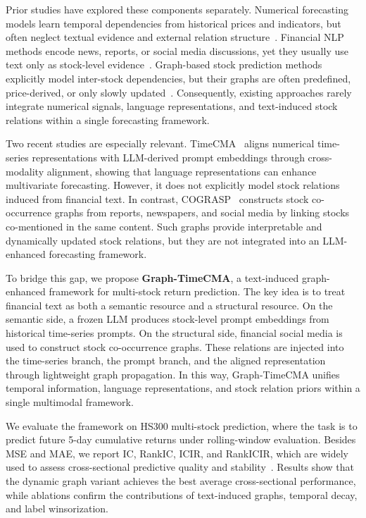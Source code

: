 \documentclass[runningheads]{llncs}
\begin{document}
Prior studies have explored these components separately. Numerical forecasting models learn temporal dependencies from historical prices and indicators, but often neglect textual evidence and external relation structure~\cite{zhou2021informer,wu2021autoformer,nie2022patchtst,liu2023itransformer,wang2024timemixer}. Financial NLP methods encode news, reports, or social media discussions, yet they usually use text only as stock-level evidence~\cite{xu2018stocknet,sawhney2020deep,araci2019finbert,wu2023bloomberggpt,wang2024llmfactor}. Graph-based stock prediction methods explicitly model inter-stock dependencies, but their graphs are often predefined, price-derived, or only slowly updated~\cite{xu2021hist,qian2024mdgnn,xia2024cisthpan}. Consequently, existing approaches rarely integrate numerical signals, language representations, and text-induced stock relations within a single forecasting framework.

Two recent studies are especially relevant. TimeCMA~\cite{liu2025timecma} aligns numerical time-series representations with LLM-derived prompt embeddings through cross-modality alignment, showing that language representations can enhance multivariate forecasting. However, it does not explicitly model stock relations induced from financial text. In contrast, COGRASP~\cite{li2025cograsp} constructs stock co-occurrence graphs from reports, newspapers, and social media by linking stocks co-mentioned in the same content. Such graphs provide interpretable and dynamically updated stock relations, but they are not integrated into an LLM-enhanced forecasting framework.

To bridge this gap, we propose \textbf{Graph-TimeCMA}, a text-induced graph-enhanced framework for multi-stock return prediction. The key idea is to treat financial text as both a semantic resource and a structural resource. On the semantic side, a frozen LLM produces stock-level prompt embeddings from historical time-series prompts. On the structural side, financial social media is used to construct stock co-occurrence graphs. These relations are injected into the time-series branch, the prompt branch, and the aligned representation through lightweight graph propagation. In this way, Graph-TimeCMA unifies temporal information, language representations, and stock relation priors within a single multimodal framework.

We evaluate the framework on HS300 multi-stock prediction, where the task is to predict future 5-day cumulative returns under rolling-window evaluation. Besides MSE and MAE, we report IC, RankIC, ICIR, and RankICIR, which are widely used to assess cross-sectional predictive quality and stability~\cite{grinold2000active}. Results show that the dynamic graph variant achieves the best average cross-sectional performance, while ablations confirm the contributions of text-induced graphs, temporal decay, and label winsorization.
\end{document}
